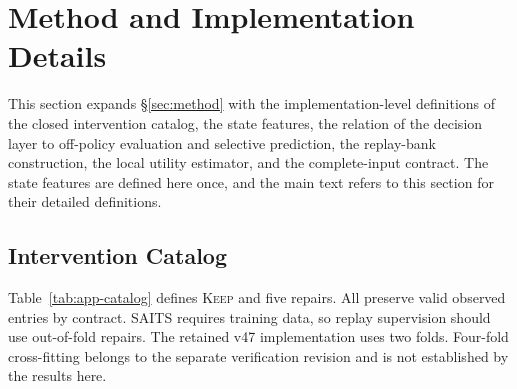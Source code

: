 \documentclass{article}
\begin{document}
\section{Method and Implementation Details}
\label{app:method-details}

This section expands \S\ref{sec:method} with the implementation-level definitions of the
closed intervention catalog, the state features, the relation of the decision layer to
off-policy evaluation and selective prediction, the replay-bank construction, the local
utility estimator, and the complete-input contract. The state features are defined here
once, and the main text refers to this section for their detailed definitions.

\subsection{Intervention Catalog}
\label{app:catalog}
Table~\ref{tab:app-catalog} defines \textsc{Keep} and five repairs. All preserve valid observed
entries by contract. SAITS requires training data, so replay supervision should use
out-of-fold repairs. The retained v47 implementation uses two folds. Four-fold cross-fitting
belongs to the separate verification revision and is not established by the results here.

\begin{table}[htbp]
  \caption{The six admissible interventions. Observed entries are the entries that are
  present and valid in the reference input $X^{a_0}$, and an action that modified them would
  violate the integrity constraint of \S\ref{sec:method-problem}.}
  \label{tab:app-catalog}
  \centering
  \small
  \setlength{\tabcolsep}{4pt}
\end{table}
\end{document}
